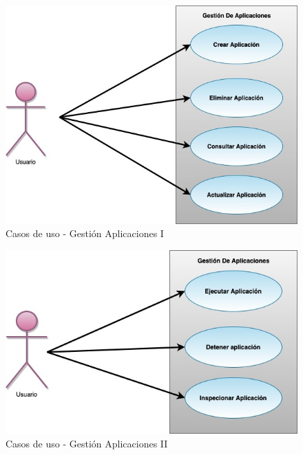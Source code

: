 \documentclass[a4paper,11pt]{book}
\begin{document}
\begin{figure}[H]
\centering
\includegraphics[scale=0.50]{imagenes/casosUso1.jpg}
\caption{ Casos de uso - Gestión Aplicaciones I~\cite{diagrama}  }
\label{c1}
\end{figure}

\begin{figure}[H]
\centering
\includegraphics[scale=0.50]{imagenes/casosUso2.jpg}
\caption{ Casos de uso - Gestión Aplicaciones II~\cite{diagrama}  }
\label{c2}
\end{figure}
\end{document}
